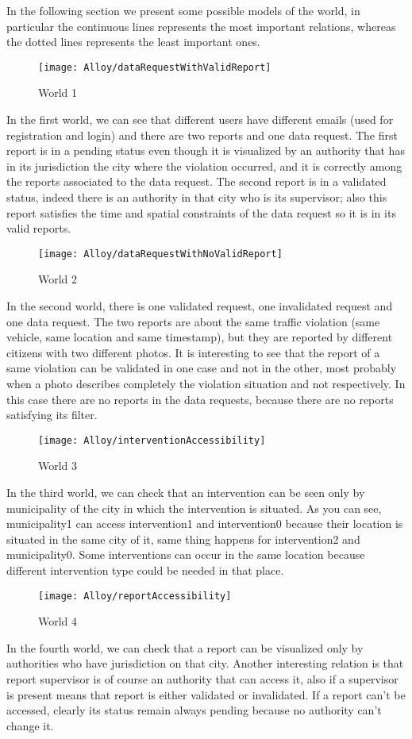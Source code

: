 In the following section we present some possible models of the world, in particular the continuous lines represents the most important relations, whereas the dotted lines represents the least important ones.
\begin{figure}[H]
	\centering
	\texttt{[image: Alloy/dataRequestWithValidReport]}
	\caption{World 1}
\end{figure}
In the first world, we can see that different users have different emails (used for registration and login) and there are two reports and one data request. The first report is in a pending status even though it is visualized by an authority that has in its jurisdiction the city where the violation occurred, and it is correctly among the reports associated to the data request. The second report is in a validated status, indeed there is an authority in that city who is its supervisor; also this report satisfies the time and spatial constraints of the data request so it is in its valid reports.
\begin{figure}[H]
	\centering
	\texttt{[image: Alloy/dataRequestWithNoValidReport]}
	\caption{World 2}
\end{figure}
In the second world, there is one validated request, one invalidated request and one data request. The two reports are about the same traffic violation (same vehicle, same location and same timestamp), but they are reported by different citizens with two different photos. It is interesting to see that the report of a same violation can be validated in one case and not in the other, most probably when a photo describes completely the violation situation and not respectively. In this case there are no reports in the data requests, because there are no reports satisfying its filter.
\begin{figure}[H]
	\centering
	\texttt{[image: Alloy/interventionAccessibility]}
	\caption{World 3}
\end{figure}

In the third world, we can check that an intervention can be seen only by municipality of the city in which the intervention is situated. As you can see, municipality1 can access intervention1 and intervention0 because their location is situated in the same city of it, same thing happens for intervention2 and municipality0. Some interventions can occur in the same location because different intervention type could be needed in that place.

\begin{figure}[H]
	\centering
	\texttt{[image: Alloy/reportAccessibility]}
	\caption{World 4}
\end{figure}

In the fourth world, we can check that a report can be visualized only by authorities who have jurisdiction on that city. Another interesting relation is that report supervisor is of course an authority that can access it, also if a supervisor is present means that report is either validated or invalidated. If a report can't be accessed, clearly its status remain always pending because no authority can't change it.